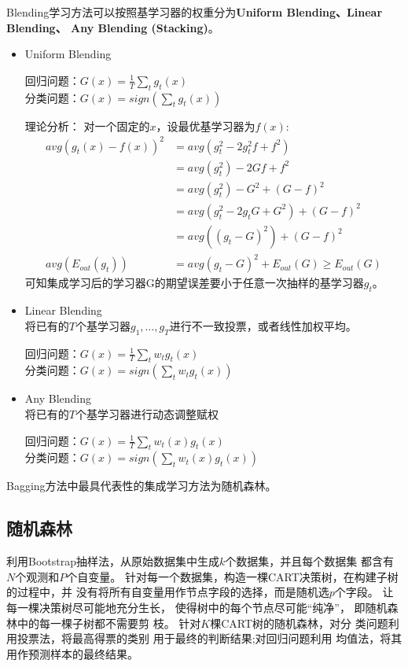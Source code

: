 \documentclass[twoside]{article}
\begin{document}
Blending学习方法可以按照基学习器的权重分为\textbf{Uniform Blending、Linear Blending、 Any Blending (Stacking)}。
\begin{itemize}
    \item Uniform Blending
    \begin{center}
        回归问题：$G(x)=\frac{1}{T}\sum_t g_t(x)$\\
        分类问题：$G(x)=sign(\sum_t g_t(x))$
    \end{center}
    理论分析：
    对一个固定的$x$，设最优基学习器为$f(x)$:\begin{equation*}
        \begin{aligned}
            avg(g_t(x)-f(x))^2&=avg\left(g_t^2-2g^2_tf+f^2\right)\\
            &=avg(g_t^2)-2Gf+f^2\\
            &=avg(g_t^2)-G^2+(G-f)^2\\
            &=avg(g^2_t-2g_tG+G^2)+(G-f)^2\\
            &=avg\left((g_t-G)^2\right)+(G-f)^2\\
            avg(E_{out}(g_t))&=avg(g_t-G)^2+E_{out}(G)\ge E_{out}(G)
        \end{aligned}
    \end{equation*}
    可知集成学习后的学习器G的期望误差要小于任意一次抽样的基学习器$g_t$。
    \item  Linear Blending\\
    将已有的$T$个基学习器$g_1,\ldots,g_T$进行不一致投票，或者线性加权平均。
    \begin{center}
        回归问题：$G(x)=\frac{1}{T}\sum_t w_t g_t(x)$\\
        分类问题：$G(x)=sign(\sum_t w_t g_t(x))$
    \end{center}
    \item Any Blending\\
    将已有的$T$个基学习器进行动态调整赋权
    \begin{center}
        回归问题：$G(x)=\frac{1}{T}\sum_t w_t(x) g_t(x)$\\
        分类问题：$G(x)=sign(\sum_t w_t(x) g_t(x))$
    \end{center}
\end{itemize}
Bagging方法中最具代表性的集成学习方法为随机森林。
\subsection*{随机森林}
利用Bootstrap抽样法，从原始数据集中生成$k$个数据集，并且每个数据集 都含有$N$个观测和$P$个自变量。
针对每一个数据集，构造一棵CART决策树，在构建子树的过程中，并 没有将所有自变量用作节点字段的选择，而是随机选$p$个字段。
让每一棵决策树尽可能地充分生长，
使得树中的每个节点尽可能“纯净”，
即随机森林中的每一棵子树都不需要剪
枝。
针对$K$棵CART树的随机森林，对分 类问题利用投票法，将最高得票的类别 用于最终的判断结果;对回归问题利用 均值法，将其用作预测样本的最终结果。
\end{document}
